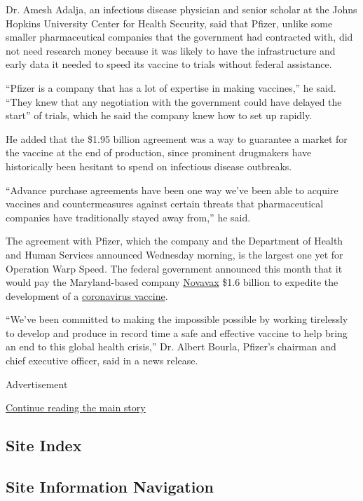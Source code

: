 Dr. Amesh Adalja, an infectious disease physician and senior scholar at
the Johns Hopkins University Center for Health Security, said that
Pfizer, unlike some smaller pharmaceutical companies that the government
had contracted with, did not need research money because it was likely
to have the infrastructure and early data it needed to speed its vaccine
to trials without federal assistance.

``Pfizer is a company that has a lot of expertise in making vaccines,''
he said. ``They knew that any negotiation with the government could have
delayed the start'' of trials, which he said the company knew how to set
up rapidly.

He added that the \$1.95 billion agreement was a way to guarantee a
market for the vaccine at the end of production, since prominent
drugmakers have historically been hesitant to spend on infectious
disease outbreaks.

``Advance purchase agreements have been one way we've been able to
acquire vaccines and countermeasures against certain threats that
pharmaceutical companies have traditionally stayed away from,'' he said.

The agreement with Pfizer, which the company and the Department of
Health and Human Services announced Wednesday morning, is the largest
one yet for Operation Warp Speed. The federal government announced this
month that it would pay the Maryland-based company
\href{https://www.nytimes.com/2020/07/16/health/coronavirus-vaccine-novavax.html}{Novavax}
\$1.6 billion to expedite the development of a
\href{https://www.nytimes.com/interactive/2020/science/coronavirus-vaccine-tracker.html}{coronavirus
vaccine}.

``We've been committed to making the impossible possible by working
tirelessly to develop and produce in record time a safe and effective
vaccine to help bring an end to this global health crisis,'' Dr. Albert
Bourla, Pfizer's chairman and chief executive officer, said in a news
release.

Advertisement

\protect\hyperlink{after-bottom}{Continue reading the main story}

\hypertarget{site-index}{%
\subsection{Site Index}\label{site-index}}

\hypertarget{site-information-navigation}{%
\subsection{Site Information
Navigation}\label{site-information-navigation}}


